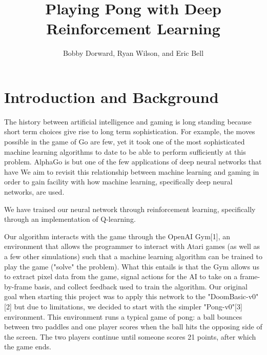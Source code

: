 \documentclass[12pt]{article}
\theoremstyle{plain}
\theoremstyle{definition}
\theoremstyle{remark}
\theoremstyle{plain}
\begin{document}
\title{Playing Pong with Deep Reinforcement Learning}
\author{Bobby Dorward, Ryan Wilson, and Eric Bell}
\maketitle

\section{Introduction and Background}
\par 
The history between artificial intelligence and gaming is long standing because short term choices give rise to long term sophistication.  For example, the moves possible in the game of Go are few, yet it took one of the most sophisticated machine learning algorithms to date to be able to perform sufficiently at this problem.  AlphaGo is but one of the few applications of deep neural networks that have We aim to revisit this relationship between machine learning and gaming in order to gain facility with how machine learning, specifically deep neural networks, are used.
\par
We have trained our neural network through reinforcement learning, specifically through an implementation of Q-learning. %
\par
Our algorithm interacts with the game through the OpenAI Gym[1], an environment that allows the programmer to interact with Atari games (as well as a few other simulations) such that a machine learning algorithm can be trained to play the game ("solve" the problem).  What this entails is that the Gym allows us to extract pixel data from the game, signal actions for the AI to take on a frame-by-frame basis, and collect feedback used to train the algorithm.  Our original goal when starting this project was to apply this network to the "DoomBasic-v0"[2] but due to limitations, we decided to start with the simpler "Pong-v0"[3] environment.  This environment runs a typical game of pong: a ball bounces between two paddles and one player scores when the ball hits the opposing side of the screen.  The two players continue until someone scores 21 points, after which the game ends.
\end{document}
